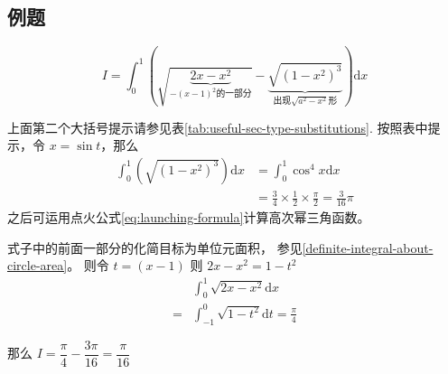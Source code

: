 \subsection{例题}

\begin{example}\label{example:w660t60}
    \[
        I = \int_0^1 \left(\sqrt{\underbrace{2x-x^2}_{-(x-1)^2\mbox{的一部分}}} 
        - \underbrace{\sqrt{(1-x^2)^3}}_{\mbox{出现}\sqrt{a^2-x^2}\mbox{形}}\right) \mathrm{d}x
    \]
    \cite[page 24, question 60]{w660}

    上面第二个大括号提示请参见表\ref{tab:useful-sec-type-substitutions}.
    按照表中提示，令 $x = \sin t$，那么
    \begin{align*}
        \int_0^1 \left(
            \sqrt{(1-x^2)^3}
        \right) \mathrm{d}x
        &=
        \int_0^1 
            \cos^4 x
        \mathrm{d}x\\
        &=
        \frac{3}{4} \times \frac{1}{2} \times \frac{\pi}{2} = \frac{3}{16} \pi
    \end{align*}
    之后可运用点火公式\ref{eq:launching-formula}计算高次幂三角函数。

    式子中的前面一部分的化简目标为单位元面积，
    参见\ref{definite-integral-about-circle-area}。
    则令 $t = (x-1)$ 则 $2x-x^2 = 1-t^2$
    \begin{align*}
        &\int_0^1 \sqrt{2x-x^2} \mathrm{d}x\\
        = 
        &\int_{-1}^0 \sqrt{1-t^2} \mathrm{d}t = \frac{\pi}{4}
    \end{align*}
    
    那么 $I = \dfrac{\pi}{4} - \dfrac{3\pi}{16} = \dfrac{\pi}{16}$
\end{example}

